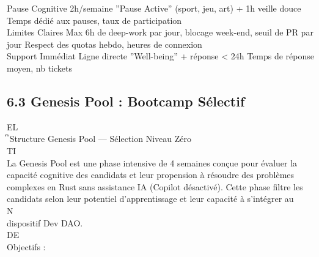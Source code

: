 Pause Cognitive        2h/semaine ”Pause Active” (sport, jeu, art) + 1h veille douce             Temps dédié aux pauses, taux de participation\\
Limites Claires        Max 6h de deep-work par jour, blocage week-end, seuil de PR par jour      Respect des quotas hebdo, heures de connexion\\
Support Immédiat       Ligne directe ”Well-being” + réponse \textless{} 24h                                Temps de réponse moyen, nb tickets\\
\vspace{0.5em}
\vspace{0.5em}
\vspace{0.5em}
\vspace{0.5em}
\subsection{6.3 Genesis Pool : Bootcamp Sélectif}
\vspace{0.5em}
\vspace{0.5em}
\vspace{0.5em}
\vspace{0.5em}
EL\\
͆ Structure Genesis Pool — Sélection Niveau Zéro\\
\vspace{0.5em}
\vspace{0.5em}
\vspace{0.5em}
\vspace{0.5em}
TI\\
La Genesis Pool est une phase intensive de 4 semaines conçue pour évaluer la capacité cognitive des candidats et leur propension à résoudre des problèmes\\
complexes en Rust sans assistance IA (Copilot désactivé). Cette phase filtre les candidats selon leur potentiel d’apprentissage et leur capacité à s’intégrer au\\
\vspace{0.5em}
\vspace{0.5em}
\vspace{0.5em}
\vspace{0.5em}
N\\
dispositif Dev DAO.\\
\vspace{0.5em}
\vspace{0.5em}
\vspace{0.5em}
\vspace{0.5em}
DE\\
Objectifs :\\
